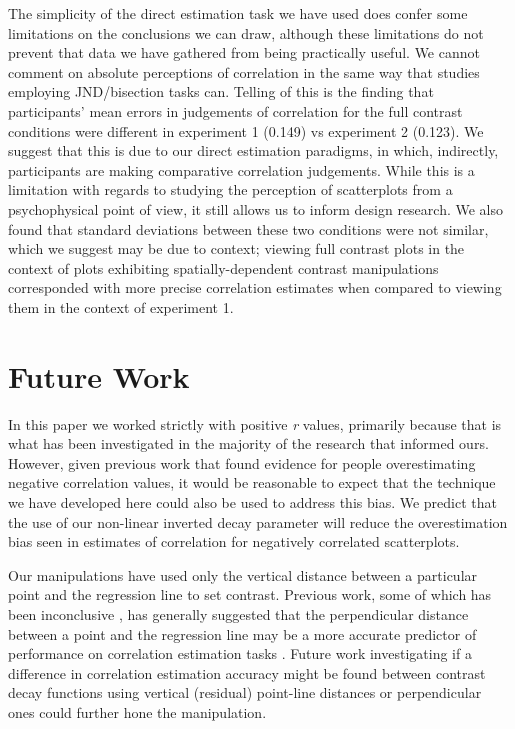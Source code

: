 \documentclass[preprint, 3p,
authoryear]{elsarticle} %
\begin{document}
The simplicity of the direct estimation task we have used does confer
some limitations on the conclusions we can draw, although these
limitations do not prevent that data we have gathered from being
practically useful. We cannot comment on absolute perceptions of
correlation in the same way that studies employing JND/bisection tasks
can. Telling of this is the finding that participants' mean errors in
judgements of correlation for the full contrast conditions were
different in experiment 1 (0.149) vs experiment 2 (0.123). We suggest
that this is due to our direct estimation paradigms, in which,
indirectly, participants are making comparative correlation judgements.
While this is a limitation with regards to studying the perception of
scatterplots from a psychophysical point of view, it still allows us to
inform design research. We also found that standard deviations between
these two conditions were not similar, which we suggest may be due to
context; viewing full contrast plots in the context of plots exhibiting
spatially-dependent contrast manipulations corresponded with more
precise correlation estimates when compared to viewing them in the
context of experiment 1.

\hypertarget{future-work}{%
\section{Future Work}\label{future-work}}

In this paper we worked strictly with positive \emph{r} values,
primarily because that is what has been investigated in the majority of
the research that informed ours. However, given previous work
\citep{sher_2017} that found evidence for people overestimating negative
correlation values, it would be reasonable to expect that the technique
we have developed here could also be used to address this bias. We
predict that the use of our non-linear inverted decay parameter will
reduce the overestimation bias seen in estimates of correlation for
negatively correlated scatterplots.

Our manipulations have used only the vertical distance between a
particular point and the regression line to set contrast. Previous work,
some of which has been inconclusive \citep{meyer_1997}, has generally
suggested that the perpendicular distance between a point and the
regression line may be a more accurate predictor of performance on
correlation estimation tasks
\citep{cleveland_1982, yang_2019, rensink_2017}. Future work
investigating if a difference in correlation estimation accuracy might
be found between contrast decay functions using vertical (residual)
point-line distances or perpendicular ones could further hone the
manipulation.
\end{document}
